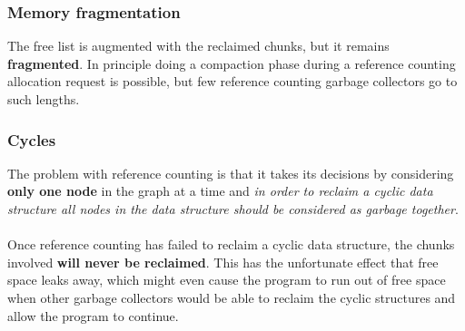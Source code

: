 \documentclass[presentation]{beamer}
\begin{document}
\begin{frame}
  \frametitle{Memory fragmentation} 
  \justifying
The free list is augmented with the reclaimed chunks, but it remains \textbf{fragmented}. In principle
doing a compaction phase during a reference counting allocation request is possible,
but few reference counting garbage collectors go to such lengths.

    \begin{figure}
        \centering
        \label{fig:compaction_example}
    \end{figure}

\end{frame}


\begin{frame}
  \frametitle{Cycles} 
  \justifying
The problem with reference counting is that it takes its decisions by considering
\textbf{only one node} in the graph at a time and \textsl{in order to reclaim a cyclic data structure all
nodes in the data structure should be considered as garbage together}. 
\\~\\
\justifying
Once reference counting has failed to reclaim a cyclic data structure, the chunks involved \textbf{will never
be reclaimed}. This has the unfortunate effect that free space leaks away, which might
even cause the program to run out of free space when other garbage collectors would
be able to reclaim the cyclic structures and allow the program to continue.
\end{frame}
\end{document}
